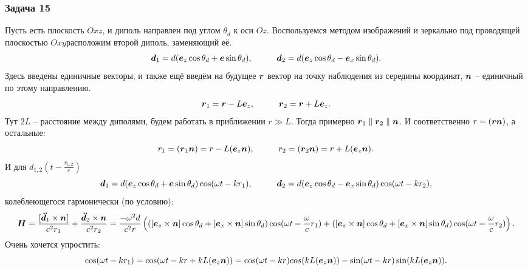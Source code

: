 \subsubsection*{Задача 15}
Пусть есть плоскость $Oxz$, и диполь направлен под углом $\theta_d$ к оси $Oz$.
Воспользуемся методом изображений и зеркально под проводящей плоскостью $Oxy$расположим второй диполь, заменяющий её.
\begin{equation*}
	\mbox{\boldmath $d$}_1 = d (\mbox{\boldmath $e$}_z\cos \theta_d + \mbox{\boldmath $e$} \sin \theta_d),
	\hspace{1 cm}
	\mbox{\boldmath $d$}_2 = d (\mbox{\boldmath $e$}_z \cos \theta_d  - \mbox{\boldmath $e$}_x \sin \theta_d).
\end{equation*}
Здесь введены единичные векторы, и также ещё введём на будущее $\mbox{\boldmath $r$}$ вектор на точку наблюдения из середины координат, $\mbox{\boldmath $n$}$ -- единичный по этому направлению.
\begin{equation*}
	\mbox{\boldmath $r$}_1 = \mbox{\boldmath $r$} - L \mbox{\boldmath $e$}_z,
	\hspace{1 cm}
	\mbox{\boldmath $r$}_2 = \mbox{\boldmath $r$} + L \mbox{\boldmath $e$}_z.
\end{equation*}
Тут $2L$ -- расстояние между диполями, будем работать в приближении $r \gg L$. Тогда примерно $\mbox{\boldmath $r$}_1 \parallel \mbox{\boldmath $r$}_2 \parallel \mbox{\boldmath $n$}$. 
И соответственно $r = (\mbox{\boldmath $r$} \mbox{\boldmath $n$})$, а остальные: \begin{equation*}
	r_1 = (\mbox{\boldmath $r$}_1 \mbox{\boldmath $n$}) = r - L (\mbox{\boldmath $e$}_z \mbox{\boldmath $n$}),
	\hspace{1 cm}
	r_2 = (\mbox{\boldmath $r$}_2 \mbox{\boldmath $n$}) = r + L (\mbox{\boldmath $e$}_z \mbox{\boldmath $n$}).
\end{equation*}
И для $d_{1,2} (t - \frac{r_{1,2}}{c})$
\begin{equation*}
	\mbox{\boldmath $d$}_1 = d (\mbox{\boldmath $e$}_z\cos \theta_d + \mbox{\boldmath $e$} \sin \theta_d) \cos (\omega t - k r_1),
	\hspace{1 cm}
	\mbox{\boldmath $d$}_2 = d (\mbox{\boldmath $e$}_z \cos \theta_d  - \mbox{\boldmath $e$}_x \sin \theta_d) \cos (\omega t - k r_2),
\end{equation*}
колеблеющегося гармонически (по условию):
\begin{equation*}
	\mbox{\boldmath $H$} = \frac{[\mbox{\boldmath $\ddot{d}$}_1 \times \mbox{\boldmath $n$}]}{c^2 r_1} + \frac{\mbox{\boldmath $\ddot{d}$}_2 \times \mbox{\boldmath $n$}}{c^2 r_2}
	=
	\frac{- \omega^2 d}{c^2 r} \left(( [\mbox{\boldmath $e$}_z \times \mbox{\boldmath $n$}] \cos \theta_d 
	+ [\mbox{\boldmath $e$}_x \times \mbox{\boldmath $n$}] \sin \theta_d) \cos(\omega t - \frac{\omega}{c}r_1)
	+
( [\mbox{\boldmath $e$}_z \times \mbox{\boldmath $n$}] \cos \theta_d 
	+ [\mbox{\boldmath $e$}_x \times \mbox{\boldmath $n$}] \sin \theta_d) \cos(\omega t - \frac{\omega}{c}r_2)
	\right).
\end{equation*}
Очень хочется упростить: 
\begin{equation*}
	\cos(\omega t - k r_1) = \cos (\omega t - k r + k L (\mbox{\boldmath $e$}_z \mbox{\boldmath $n$}))
	=
	\cos(\omega t - k r) cos (k L (\mbox{\boldmath $e$}_z \mbox{\boldmath $n$}))	- \sin (\omega t - k r) \sin (k L (\mbox{\boldmath $e$}_z \mbox{\boldmath $n$})).
\end{equation*}
